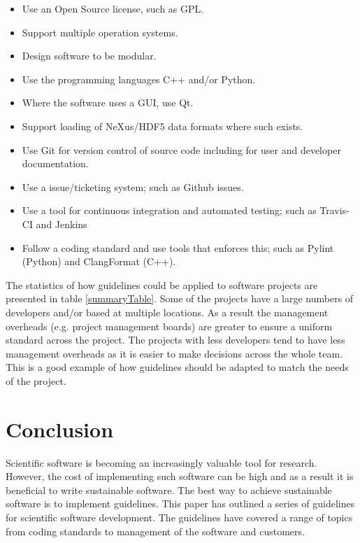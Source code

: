 \documentclass[jnr]{iosart2x}
\begin{document}
\begin{itemize}
      \item Use an Open Source license, such as GPL.
      \item Support multiple operation systems.
      \item Design software to be modular.
      \item Use the programming languages C++ and/or Python.
      \item Where the software uses a GUI, use Qt.
      \item Support loading of NeXus/HDF5 data formats where such exists.
      \item Use Git for version control of source code including for user and developer documentation.
      \item Use a issue/ticketing system; such as Github issues.
      \item Use a tool for continuous integration and automated testing; such as Travis-CI and Jenkins
      \item Follow a coding standard and use tools that enforces this; such as Pylint (Python) and ClangFormat (C++).
\end{itemize}

The statistics of how guidelines could be applied to software projects are presented in table \ref{summaryTable}.
Some of the projects have a large numbers of developers and/or based at multiple locations.
As a result the management overheads (e.g. project management boards) are greater to ensure a uniform standard across the project.
The projects with less developers tend to have less management overheads as it is easier to make decisions across the whole team.
This is a good example of how guidelines should be adapted to match the needs of the project.

\section{Conclusion}
\label{Conclusion}

Scientific software is becoming an increasingly valuable tool for research.
However, the cost of implementing such software can be high and as a result it is beneficial to write sustainable software.
The best way to achieve sustainable software is to implement guidelines.
This paper has outlined a series of guidelines for scientific software development.
The guidelines have covered a range of topics from coding standards to management of the software and customers.
\end{document}
